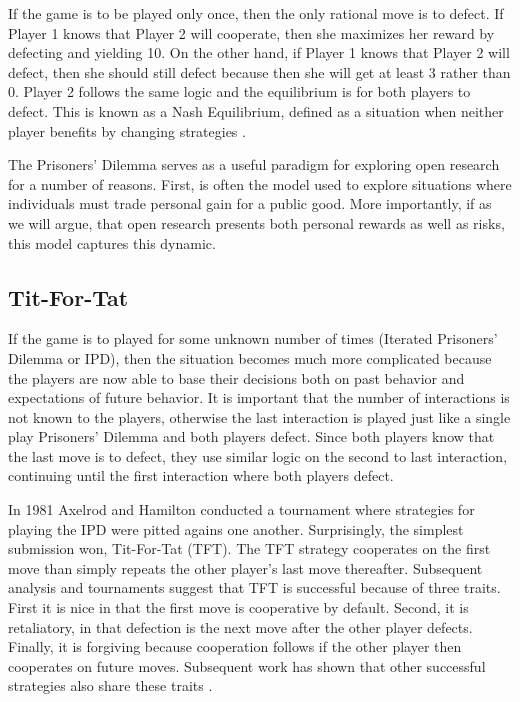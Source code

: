 \documentclass[11pt]{article} %
\begin{document}
If the game is to be played only once, then the only rational move is to defect. If Player 1 knows that Player 2 will cooperate, then she maximizes her reward by defecting and yielding 10. On the other hand, if Player 1 knows that Player 2 will defect, then she should still defect because then she will get at least 3 rather than 0. Player 2 follows the same logic and the equilibrium is for both players to defect. This is known as a Nash Equilibrium, defined as a situation when neither player benefits by changing strategies \cite{unm.b196052419570101}.

The Prisoners' Dilemma serves as a useful paradigm for exploring open research for a number of reasons. First, is often the model used to explore situations where individuals must trade personal gain for a public good. More importantly, if as we will argue, that open research presents both personal rewards as well as risks, this model captures this dynamic.

\subsection{Tit-For-Tat}
If the game is to played for some unknown number of times (Iterated Prisoners' Dilemma or IPD), then the situation becomes much more complicated because the players are now able to base their decisions both on past behavior and expectations of future behavior. It is important that the number of interactions is not known to the players, otherwise the last interaction is played just like a single play Prisoners' Dilemma and both players defect. Since both players know that the last move is to defect, they use similar logic on the second to last interaction, continuing until the first interaction where both players defect.

 In 1981  Axelrod and Hamilton \cite{axelrodhamilton1981} conducted a tournament where strategies for playing the IPD were pitted agains one another. Surprisingly, the simplest submission won, Tit-For-Tat (TFT). The TFT strategy cooperates on the first move than simply repeats the other player's last move thereafter. Subsequent analysis and tournaments suggest that TFT is successful because of three traits. First it is nice in that the first move is cooperative by default. Second, it is retaliatory, in that defection is the next move after the other player defects. Finally, it is forgiving because cooperation follows if the other player then cooperates on future moves. Subsequent work has shown that other successful strategies also share these traits
\cite{axelroddion1988, ABAGFBEC19920101, unm.b685148920000101}.
\end{document}
